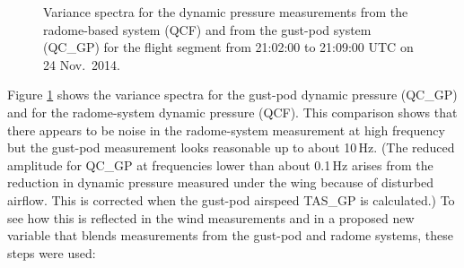 \documentclass[12pt,twoside,english]{article}\usepackage[]{graphicx}\usepackage[]{color}
\let\OrgIndex\index
\renewcommand*{\index}[1]{\OrgIndex{#1}}
\begin{document}
{{\begin{appendices}
\begin{figure}
\protect\protect\protect\caption{\label{fig:AppxB-PSD1314}Variance spectra for the dynamic pressure measurements from the radome-based system (QCF) and from the gust-pod system (QC\_GP) for the flight segment from 21:02:00 to 21:09:00 UTC on 24 Nov.\ 2014.} 
\end{figure}

Figure \ref{fig:AppxB-PSD1314} shows the variance spectra for the gust-pod dynamic pressure (QC\_GP) and for the radome-system dynamic pressure (QCF). This comparison shows that there appears to be 
noise in the radome-system measurement at high frequency but the gust-pod measurement looks reasonable up to about 10\,Hz. (The reduced amplitude for QC\_GP at frequencies lower than about 0.1\,Hz arises from the reduction in dynamic pressure measured under the wing because of disturbed airflow. This is corrected when the gust-pod airspeed TAS\_GP is calculated.) To see how this is reflected in the wind measurements and in a proposed new variable that blends measurements from the gust-pod and radome systems, these steps were used: 


\end{appendices}}}
\end{document}
